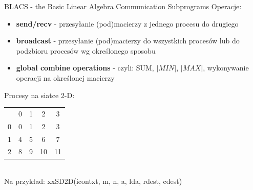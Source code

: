 	\begin{frame}{BLACS - the Basic Linear Algebra Communication Subprograms}
		Operacje: 
		\begin{itemize}
			\item	\textbf{send/recv} - przesyłanie (pod)macierzy z jednego procesu do drugiego
			\item \textbf{broadcast} - przesyłanie (pod)macierzy do wszystkich procesów lub do podzbioru procesów wg określonego sposobu
			\item \textbf{global combine operations} - czyli: SUM, $|MIN|$, $|MAX|$, wykonywanie operacji na określonej macierzy
		\end{itemize}
		Procesy na siatce 2-D:
		\begin{tabular}{ c|c|c|c|c| }
			\multicolumn{1}{c}{} & \multicolumn{1}{c}{0} & \multicolumn{1}{c}{1} & \multicolumn{1}{c}{2} & \multicolumn{1}{c}{3} \\
			\cline{2-5} 0 & 0 & 1 & 2 & 3 \\
			\cline{2-5} 1 & 4 & 5 & 6 & 7 \\
			\cline{2-5} 2 & 8 & 9 & 10 & 11 \\
			\cline{2-5}
		\end{tabular} \\
		Na przykład: xxSD2D(icontxt, m, n, a, lda, rdest, cdest)
	\end{frame}
	
